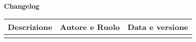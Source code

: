 \newpage
\begin{center}
	\Large{\textbf{Changelog}}
	\\\vspace{0.5cm}
	\normalsize
	\begin{tabularx}{\textwidth}{Xcc}
		\textbf{Descrizione} & \textbf{Autore e Ruolo} & \textbf{Data e versione} \\\toprule
		\modifiche
		\bottomrule
	\end{tabularx}
\end{center}
\newpage